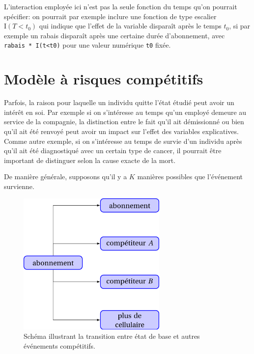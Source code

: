 \documentclass[
  11pt,
  letterpaper,
]{scrbook}
\theoremstyle{definition}
\theoremstyle{remark}
\begin{document}
L'interaction employée ici n'est pas la seule fonction du temps qu'on
pourrait spécifier: on pourrait par exemple inclure une fonction de type
escalier \(\mathrm{I}(T< t_0)\) qui indique que l'effet de la variable
disparaît après le temps \(t_0\), si par exemple un rabais disparaît
après une certaine durée d'abonnement, avec
\texttt{rabais\ *\ I(t\textless{}t0)} pour une valeur numérique
\texttt{t0} fixée.

\hypertarget{moduxe8le-uxe0-risques-compuxe9titifs}{%
\section{Modèle à risques
compétitifs}\label{moduxe8le-uxe0-risques-compuxe9titifs}}

Parfois, la raison pour laquelle un individu quitte l'état étudié peut
avoir un intérêt en soi. Par exemple si on s'intéresse au temps qu'un
employé demeure au service de la compagnie, la distinction entre le fait
qu'il ait démissionné ou bien qu'il ait été renvoyé peut avoir un impact
sur l'effet des variables explicatives. Comme autre exemple, si on
s'intéresse au temps de survie d'un individu après qu'il ait été
diagnostiqué avec un certain type de cancer, il pourrait être important
de distinguer selon la cause exacte de la mort.

De manière générale, supposons qu'il y a \(K\) manières possibles que
l'événement survienne.

\begin{figure}[ht!]

{\centering \includegraphics[width=0.65\textwidth,height=\textheight]{./figures/transition_etats_modele_risque_competitifs.png}

}

\caption{\label{fig-transitionetat}Schéma illustrant la transition entre
état de base et autres événements compétitifs.}

\end{figure}
\end{document}
